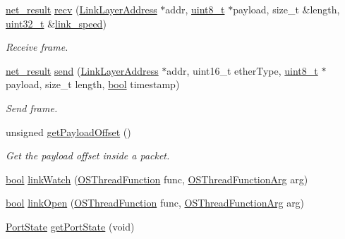 \begin{DoxyCompactItemize}
\hyperlink{avbts__osnet_8hpp_a21b2b4b5e479ef3adfc039ac30c961cd}{net\+\_\+result} \hyperlink{class_common_port_a29eedafc1eb6f2ee041ea519b9a4f3c0}{recv} (\hyperlink{class_link_layer_address}{Link\+Layer\+Address} $\ast$addr, \hyperlink{stdint_8h_aba7bc1797add20fe3efdf37ced1182c5}{uint8\+\_\+t} $\ast$payload, size\+\_\+t \&length, \hyperlink{parse_8c_a6eb1e68cc391dd753bc8ce896dbb8315}{uint32\+\_\+t} \&\hyperlink{class_common_port_aae24fc4f200e75aa8215f797b2561dbf}{link\+\_\+speed})
\begin{DoxyCompactList}\small\item\em Receive frame. \end{DoxyCompactList}\item 
\hyperlink{avbts__osnet_8hpp_a21b2b4b5e479ef3adfc039ac30c961cd}{net\+\_\+result} \hyperlink{class_common_port_a16eac0643a26a66fa2b664d4db5d3e42}{send} (\hyperlink{class_link_layer_address}{Link\+Layer\+Address} $\ast$addr, uint16\+\_\+t ether\+Type, \hyperlink{stdint_8h_aba7bc1797add20fe3efdf37ced1182c5}{uint8\+\_\+t} $\ast$payload, size\+\_\+t length, \hyperlink{avb__gptp_8h_af6a258d8f3ee5206d682d799316314b1}{bool} timestamp)
\begin{DoxyCompactList}\small\item\em Send frame. \end{DoxyCompactList}\item 
unsigned \hyperlink{class_common_port_a2697fd0fc7139659877b76cd1b022d44}{get\+Payload\+Offset} ()
\begin{DoxyCompactList}\small\item\em Get the payload offset inside a packet. \end{DoxyCompactList}\item 
\hyperlink{avb__gptp_8h_af6a258d8f3ee5206d682d799316314b1}{bool} \hyperlink{class_common_port_a2e924d1664a7395f8f7afb21107e0f21}{link\+Watch} (\hyperlink{avbts__osthread_8hpp_a68966f4aba46c269e8341073e7787d34}{O\+S\+Thread\+Function} func, \hyperlink{avbts__osthread_8hpp_af08b3560013183b63aff5fe8243818d1}{O\+S\+Thread\+Function\+Arg} arg)
\item 
\hyperlink{avb__gptp_8h_af6a258d8f3ee5206d682d799316314b1}{bool} \hyperlink{class_common_port_a60db54b7cb6a6f7b526ea23fb73eefcf}{link\+Open} (\hyperlink{avbts__osthread_8hpp_a68966f4aba46c269e8341073e7787d34}{O\+S\+Thread\+Function} func, \hyperlink{avbts__osthread_8hpp_af08b3560013183b63aff5fe8243818d1}{O\+S\+Thread\+Function\+Arg} arg)
\item 
\hyperlink{ptptypes_8hpp_a679431f1afc75d7bb9e972c022e53672}{Port\+State} \hyperlink{class_common_port_aa4182d914fdb9a27fb875d8495e0289c}{get\+Port\+State} (void)

\end{DoxyCompactItemize}
